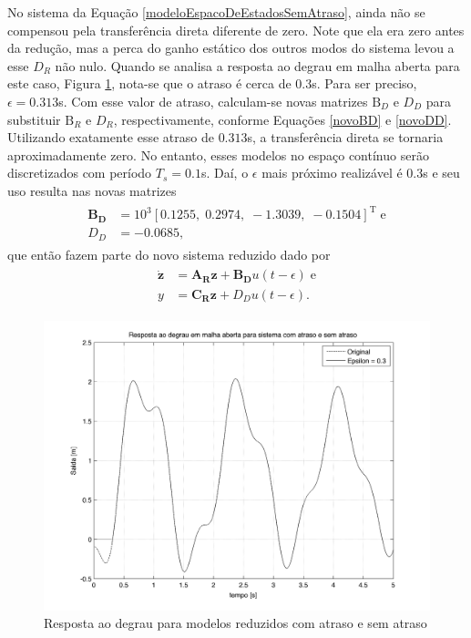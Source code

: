 No sistema da Equação \ref{modeloEspacoDeEstadosSemAtraso}, ainda não se compensou pela transferência direta diferente de zero. Note que ela era zero antes da redução, mas a perca do ganho estático dos outros modos do sistema levou a esse $D_R$ não nulo. Quando se analisa a resposta ao degrau em malha aberta para este caso, Figura \ref{modeloMalhaAberta}, nota-se que o atraso é cerca de 0.3s. Para ser preciso, $\epsilon = 0.313$s. Com esse valor de atraso, calculam-se novas matrizes $\mathrm{B}_D$ e $D_D$ para substituir $\mathrm{B}_R$ e $D_R$, respectivamente, conforme Equações \ref{novoBD} e \ref{novoDD}. Utilizando exatamente esse atraso de $0.313$s, a transferência direta se tornaria aproximadamente zero. No entanto, esses modelos no espaço contínuo serão discretizados com período $T_s = 0.1$s. Daí, o $\epsilon$ mais próximo realizável é 0.3s e seu uso resulta nas novas matrizes \begin{align}
\begin{array}{ll}
	\mathbf{B_D} &= 10^3\left[0.1255,\;
    0.2974,\;
   -1.3039,\;
   -0.1504\right]^{\mathrm{T}}\;\mathrm{e}\\
	D_D &= -0.0685,
\end{array} \label{modeloReduzidoComEpsilon}
\end{align} que então fazem parte do novo sistema reduzido dado por\begin{align}
	\begin{array}{ll}
		\mathbf{\dot{z}} &= \mathbf{A_R}\mathbf{z} + \mathbf{B_D}u(t-\epsilon)\;\mathrm{e}\\
		y &= \mathbf{C_R}\mathbf{z} + D_D u(t-\epsilon).
	\end{array}\label{modeloEEComAtraso}
\end{align}

\begin{figure}[!ht]
\centering
\includegraphics[width=0.8\linewidth]{figs/resultados/modelo/respostaMalhaAberta}
\caption{Resposta ao degrau para modelos reduzidos com atraso e sem atraso\label{modeloMalhaAberta}}
\end{figure} 

